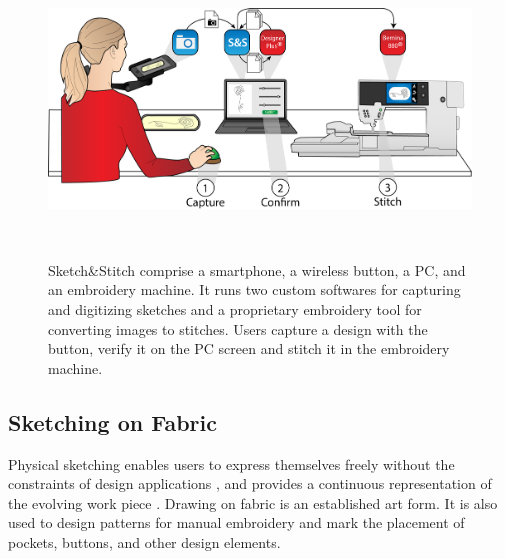 \documentclass[header.tex]{subfiles}
\begin{document}
\begin{figure}
\centering
  \includegraphics[width=1\columnwidth]{figures/UI.png}
  \caption{Sketch&Stitch comprise a smartphone, a wireless button, a PC, and an embroidery machine. It runs two custom softwares for capturing and digitizing sketches and a proprietary embroidery tool for converting images to stitches. Users capture a design with the button, verify it on the PC screen and stitch it in the embroidery machine.}~\label{fig:UI}
  \vspace{-2.2em}
\end{figure}


\subsection{Sketching on Fabric}


Physical sketching enables users to express themselves freely without the constraints of design applications \cite{landay1995interactive,Peiris:2014:PTC:2686612.2686691,schweikardt2000digital}, and provides a continuous representation of the evolving work piece \cite{willis2011interactive}. Drawing on fabric is an established art form. It is also used to design patterns for manual embroidery and mark the placement of pockets, buttons, and other design elements. 
\end{document}
